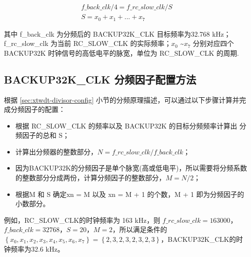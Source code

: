 \documentclass[main\_\_CN.tex]{subfiles}
\begin{document}
\begin{gather*}
f\_back\_clk / 4 = f\_rc\_slow\_clk/S \\
S = x_0 + x_1 + ... + x_7
\end{gather*}

其中 f\_back\_clk 为分频后的 BACKUP32K\_CLK 目标频率为32.768 kHz；f\_rc\_slow\_clk 为当前 RC\_SLOW\_CLK 的实际频率；\begin{math}x_0\end{math} \textasciitilde \begin{math}x_7\end{math} 分别对应四个BACKUP32K 时钟信号的高低电平的脉宽，单位为 RC\_SLOW\_CLK 的周期.

\subsection{BACKUP32K\_CLK 分频因子配置方法}

根据 \ref{sec:xtwdt-divisor-config} 小节的分频原理描述，可以通过以下步骤计算并完成分频因子的配置：
\begin{itemize}
    \item 根据 RC\_SLOW\_CLK 的频率以及 BACKUP32K 的目标分频频率计算出 分频因子的总和 S；
    \item 计算出分频器的整数部分，\begin{math}N = f\_rc\_slow\_clk / f\_back\_clk\end{math}；
    \item 因为BACKUP32K的分频因子是单个脉宽(高或低电平)，所以需要将分频系数的整数部分分成两份，计算分频因子的整数部分，\begin{math}M = N / 2\end{math}；
    \item 根据M 和 S 确定xn = M 以及 xn = M + 1 的个数，M + 1 即为分频因子的小数部分。
    \end{itemize}
    
    例如，RC\_SLOW\_CLK的时钟频率为 163 kHz，则 \begin{math} f\_rc\_slow\_clk = 163000\end{math}，\begin{math}f\_back\_clk = 32768\end{math}，\begin{math}S = 20\end{math}，\begin{math}M = 2\end{math}，所以满足条件的 \begin{math}\left\{x_0, x_1, x_2, x_3, x_4, x_5, x_6, x_7\right\} = \left\{2, 3, 2, 3, 2, 3, 2, 3\right\}\end{math}，BACKUP32K\_CLK的时钟频率为32.6 kHz。
\end{document}
